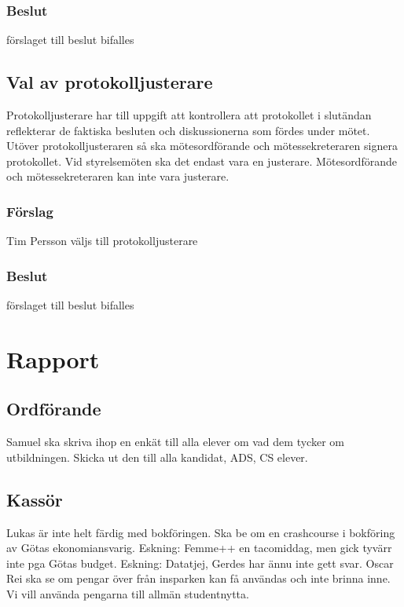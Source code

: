 \documentclass[protokoll]{dvd}
\begin{document}
\subsubsection*{Beslut}
\begin{attsatser}
    \item förslaget till beslut bifalles
\end{attsatser}

\subsection{Val av protokolljusterare}

Protokolljusterare har till uppgift att kontrollera att protokollet i slutändan reflekterar de faktiska besluten och diskussionerna som fördes under mötet.
Utöver protokolljusteraren så ska mötesordförande och mötessekreteraren signera protokollet.
Vid styrelsemöten ska det endast vara en justerare.
Mötesordförande och mötessekreteraren kan inte vara justerare.

\subsubsection*{Förslag}
\begin{attsatser}
    \item Tim Persson väljs till protokolljusterare
\end{attsatser}
\subsubsection*{Beslut}
\begin{attsatser}
    \item förslaget till beslut bifalles
\end{attsatser}

\section{Rapport}
\subsection{Ordförande}
Samuel ska skriva ihop en enkät till alla elever om vad dem tycker om utbildningen. Skicka ut den till alla kandidat, ADS,  CS elever.

\subsection{Kassör}
Lukas är inte helt färdig med bokföringen. Ska be om en crashcourse i bokföring av Götas ekonomiansvarig.
Eskning: Femme++ en tacomiddag, men gick tyvärr inte pga Götas budget.
Eskning: Datatjej, Gerdes har ännu inte gett svar.
Oscar Rei ska se om pengar över från insparken kan få användas och inte brinna inne. Vi vill använda pengarna till allmän studentnytta.
\end{document}
